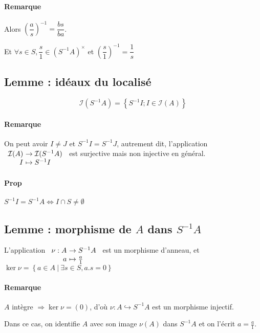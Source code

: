 \documentclass[reqno,a4paper,10pt]{report}
\newcommand{\set}[1]{\left\lbrace #1 \right\rbrace} %
\newcommand{\so}{\Rightarrow}
\newcommand{\inj}{\hookrightarrow}
\newcommand{\such}{\ | \ }
\begin{document}
\paragraph{Remarque} Alors $\left( \dfrac{a}{s}
\right)^{-1}=\dfrac{bs}{ba}$.

Et $\forall s \in S, \dfrac{s}{1} \in (S^{-1}A)^\times$ et $\left(
\dfrac{s}{1} \right)^{-1}=\dfrac{1}{s}$

\subsection{Lemme : idéaux du localisé}
\[\mathcal I(S^{-1}A)=\set{S^{-1}I; I \in \mathcal I(A)}\]

\paragraph{Remarque} On peut avoir $I\neq J$ et $S^{-1}I = S^{-1}J$, autrement
dit, l'application $\begin{array}[t]{r@{\ }l}
  \mathcal I(A) &\to \mathcal I(S^{-1}A)\\
  I &\mapsto S^{-1}I
\end{array}$ est surjective mais non injective en général.

\paragraph{Prop} $S^{-1}I = S^{-1}A \iff I\cap S \neq \emptyset$

\subsection{Lemme : morphisme de $A$ dans $S^{-1}A$}
L'application $\begin{array}[t]{r@{\ }l}
  \nu : A  &\to S^{-1}A\\
  a &\mapsto \frac{a}{1}
\end{array}$ est un morphisme d'anneau, et $\ker \nu = \set{a \in A \such
\exists s \in S, a.s=0}$

\paragraph{Remarque} $A$ intègre $\so \ker \nu = (0)$, d'où $\nu:A \inj
S^{-1}A$ est un morphisme injectif.

Dans ce cas, on identifie $A$ avec son image $\nu(A)$ dans $S^{-1}A$ et on
l'écrit $a=\frac{a}{1}$.

\begin{comment}
  Preuve 18/11/09 p2
\end{comment}
\end{document}
